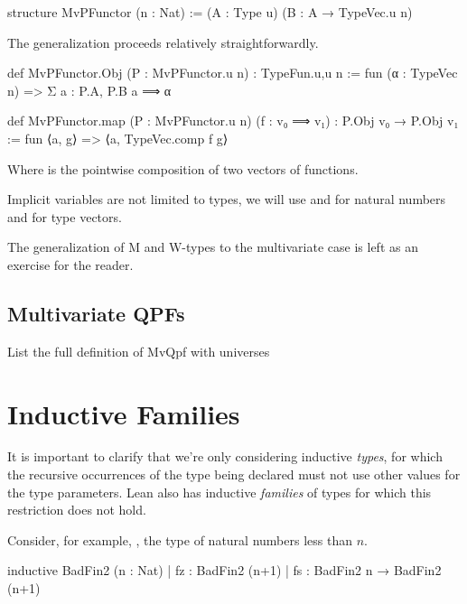 \begin{leancode}
    structure MvPFunctor (n : Nat) := (A : Type u) (B : A → TypeVec.{u} n)
\end{leancode}

The generalization proceeds relatively straightforwardly.
\begin{leancode}
    def MvPFunctor.Obj (P : MvPFunctor.{u} n) : TypeFun.{u,u} n
        := fun (α : TypeVec n) => Σ a : P.A, P.B a ⟹ α

    def MvPFunctor.map  (P : MvPFunctor.{u} n) 
                        (f : v₀ ⟹ v₁) 
                            : P.Obj v₀ → P.Obj v₁ 
        := fun ⟨a, g⟩ => ⟨a, TypeVec.comp f g⟩
\end{leancode}

Where  is the pointwise composition of two vectors of functions.

\begin{remark}
    Implicit variables are not limited to types, we will use  and  for natural numbers and  for type vectors.
\end{remark}

The generalization of M and W-types to the multivariate case is left as an exercise for the reader.

\subsection{Multivariate QPFs}

\begin{todo}
    List the full definition of MvQpf with universes
\end{todo}


\section{Inductive Families}
\label{sec:ind_families}

It is important to clarify that we're only considering inductive \emph{types}, 
for which the recursive occurrences of the type being declared must not use other values for the type parameters. Lean also has inductive \emph{families} of types for which this restriction does not hold.

Consider, for example, , the type of natural numbers less than $n$.
\begin{badleancode}
    inductive BadFin2 (n : Nat)
    | fz : BadFin2 (n+1)
    | fs : BadFin2 n → BadFin2 (n+1)
\end{badleancode}

